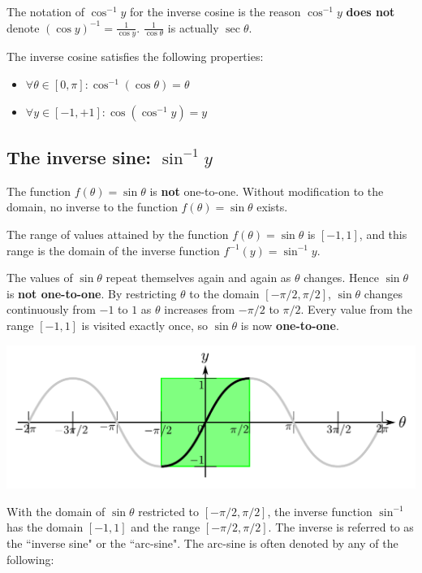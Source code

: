 \documentclass{article}
\begin{document}
The notation of \(\cos^{-1} y\) for the inverse cosine is the reason \(\cos^{-1} y\) {\bf does not} denote \((\cos y)^{-1} = \frac{1}{\cos y}\). \(\frac{1}{\cos\theta}\) is actually \(\sec\theta\).

The inverse cosine satisfies the following properties:
\begin{itemize}
\item \(\forall \theta \in [0, \pi] : \cos^{-1}(\cos\theta) = \theta\)
\item \(\forall y \in [-1, +1] : \cos(\cos^{-1}y) = y\)
\end{itemize}



\subsection{The inverse sine: $\sin^{-1} y$}

The function \(f(\theta) = \sin\theta\) is {\bf not} one-to-one. Without modification to the domain, no inverse to the function \(f(\theta) = \sin\theta\) exists. 

The range of values attained by the function \(f(\theta) = \sin\theta\) is \([-1, 1]\), and this range is the domain of the inverse function \(f^{-1}(y) = \sin^{-1} y\).

The values of \(\sin\theta\) repeat themselves again and again as \(\theta\) changes. Hence \(\sin\theta\) is {\bf not one-to-one}. By restricting \(\theta\) to the domain \([-\pi/2, \pi/2]\), \(\sin\theta\) changes continuously from \(-1\) to \(1\) as \(\theta\) increases from \(-\pi/2\) to \(\pi/2\). Every value from the range \([-1,1]\) is visited exactly once, so \(\sin\theta\) is now {\bf one-to-one}.  

\includegraphics[width = \textwidth]{making_sin_bijective}

With the domain of \(\sin\theta\) restricted to \([-\pi/2, \pi/2]\), the inverse function \(\sin^{-1}\) has the domain \([-1, 1]\) and the range \([-\pi/2, \pi/2]\). The inverse is referred to as the ``inverse sine" or the ``arc-sine". The arc-sine is often denoted by any of the following:
\end{document}
